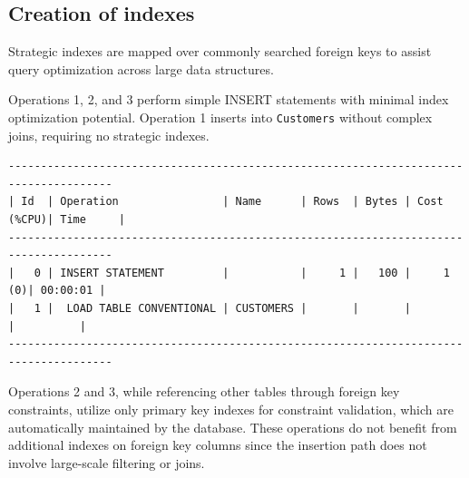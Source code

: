\subsection{Creation of indexes}

Strategic indexes are mapped over commonly searched foreign keys to assist query optimization across large data structures. 

Operations 1, 2, and 3 perform simple INSERT statements with minimal index optimization potential. Operation 1 inserts into \texttt{Customers} without complex joins, requiring no strategic indexes.

{\scriptsize
\begin{verbatim}
--------------------------------------------------------------------------------------
| Id  | Operation                | Name      | Rows  | Bytes | Cost (%CPU)| Time     |
--------------------------------------------------------------------------------------
|   0 | INSERT STATEMENT         |           |     1 |   100 |     1   (0)| 00:00:01 |
|   1 |  LOAD TABLE CONVENTIONAL | CUSTOMERS |       |       |            |          |
--------------------------------------------------------------------------------------
\end{verbatim}
}

Operations 2 and 3, while referencing other tables through foreign key constraints, utilize only primary key indexes for constraint validation, which are automatically maintained by the database. These operations do not benefit from additional indexes on foreign key columns since the insertion path does not involve large-scale filtering or joins.

